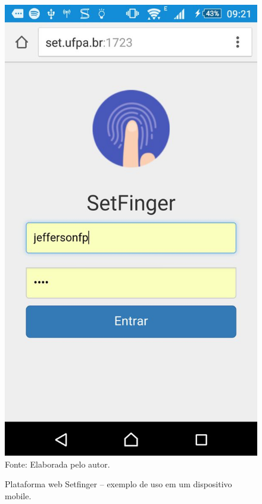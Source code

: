 \begin{figure}[!ht]
  \begin{center}
  \caption{Plataforma web Setfinger -- exemplo de uso em um dispositivo mobile.}
  \includegraphics[scale=0.22]{figuras/cap4/setfinger_web.jpg}\\
  Fonte: Elaborada pelo autor.
  \label{setfinger_web}
  \end{center}
\end{figure}

